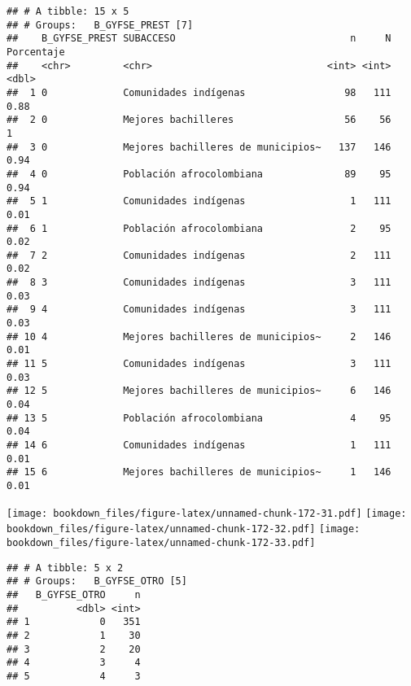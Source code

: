 \documentclass[]{article}
\theoremstyle{definition}
\theoremstyle{definition}
\theoremstyle{definition}
\theoremstyle{remark}
\begin{document}
\begin{verbatim}
## # A tibble: 15 x 5
## # Groups:   B_GYFSE_PREST [7]
##    B_GYFSE_PREST SUBACCESO                              n     N Porcentaje
##    <chr>         <chr>                              <int> <int>      <dbl>
##  1 0             Comunidades indígenas                 98   111       0.88
##  2 0             Mejores bachilleres                   56    56       1   
##  3 0             Mejores bachilleres de municipios~   137   146       0.94
##  4 0             Población afrocolombiana              89    95       0.94
##  5 1             Comunidades indígenas                  1   111       0.01
##  6 1             Población afrocolombiana               2    95       0.02
##  7 2             Comunidades indígenas                  2   111       0.02
##  8 3             Comunidades indígenas                  3   111       0.03
##  9 4             Comunidades indígenas                  3   111       0.03
## 10 4             Mejores bachilleres de municipios~     2   146       0.01
## 11 5             Comunidades indígenas                  3   111       0.03
## 12 5             Mejores bachilleres de municipios~     6   146       0.04
## 13 5             Población afrocolombiana               4    95       0.04
## 14 6             Comunidades indígenas                  1   111       0.01
## 15 6             Mejores bachilleres de municipios~     1   146       0.01
\end{verbatim}

\texttt{[image: bookdown\_files/figure-latex/unnamed-chunk-172-31.pdf]}
\texttt{[image: bookdown\_files/figure-latex/unnamed-chunk-172-32.pdf]}
\texttt{[image: bookdown\_files/figure-latex/unnamed-chunk-172-33.pdf]}

\begin{verbatim}
## # A tibble: 5 x 2
## # Groups:   B_GYFSE_OTRO [5]
##   B_GYFSE_OTRO     n
##          <dbl> <int>
## 1            0   351
## 2            1    30
## 3            2    20
## 4            3     4
## 5            4     3
\end{verbatim}
\end{document}
